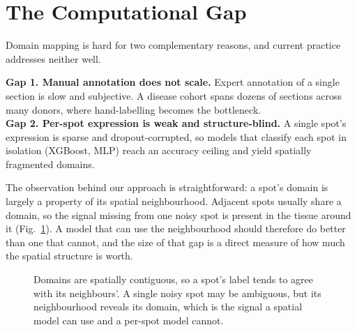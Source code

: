 \documentclass[11pt]{article}
\begin{document}
\section{The Computational Gap}

Domain mapping is hard for two complementary reasons, and current practice
addresses neither well.

\begin{gapbox}
\textbf{Gap 1. Manual annotation does not scale.} Expert annotation of a single
section is slow and subjective. A disease cohort spans dozens of sections across
many donors, where hand-labelling becomes the bottleneck.\\[3pt]
\textbf{Gap 2. Per-spot expression is weak and structure-blind.} A single spot's
expression is sparse and dropout-corrupted, so models that classify each spot in
isolation (XGBoost, MLP) reach an accuracy ceiling and yield spatially fragmented
domains.
\end{gapbox}

\noindent The observation behind our approach is straightforward: a spot's domain
is largely a property of its spatial neighbourhood. Adjacent spots usually share
a domain, so the signal missing from one noisy spot is present in the tissue
around it (Fig.~\ref{fig:mechanism}). A model that can use the neighbourhood
should therefore do better than one that cannot, and the size of that gap is a
direct measure of how much the spatial structure is worth.

\begin{figure}[H]
\centering
{}
\caption{Domains are spatially contiguous, so a spot's label tends to agree with
its neighbours'. A single noisy spot may be ambiguous, but its neighbourhood
reveals its domain, which is the signal a spatial model can use and a per-spot
model cannot.}
\label{fig:mechanism}
\end{figure}
\end{document}
